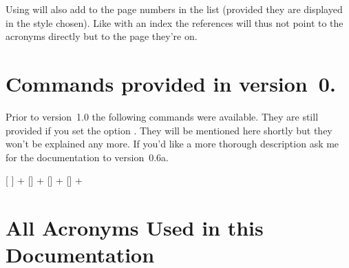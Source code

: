 \documentclass[load-preamble+,scrartcl={DIV10}]{cnltx-doc}
\makeatletter
\newcommand\versionstar{\texorpdfstring{\@versionstar}{*}}
\makeatother
\begin{document}
Using  will also add  to the page numbers in the
list (provided they are displayed in the style chosen).  Like with an index
the references will thus not point to the acronyms directly but to the page
they're on.

\appendix

\section{Commands provided in version~0.\versionstar}
Prior to version~1.0 the following commands were available.  They are still
provided if you set the option .  They will be mentioned
here shortly but they won't be explained any more.  If you'd like a more
thorough description ask me for the documentation to version~0.6a.
\begin{commands}
  [\sarg{}%
    ]
    \verbcode+% can be used only in preamble+
  []
    \verbcode+% can be used only in preamble+
  []
    \verbcode+% can be used only in preamble+
  []
    \verbcode+% can be used only in preamble+
\end{commands}

\section{All Acronyms Used in this Documentation}\label{sec:documentation_acronyms}
\begin{sourcecode}
  \printacronyms[name=All Acronyms]
\end{sourcecode}
\printacronyms[name=All Acronyms]

\begin{sourcecode}
  \printacronyms[include-classes=city,name=City Acronyms]
\end{sourcecode}
\printacronyms[include-classes=city,name=City Acronyms]
\end{document}
